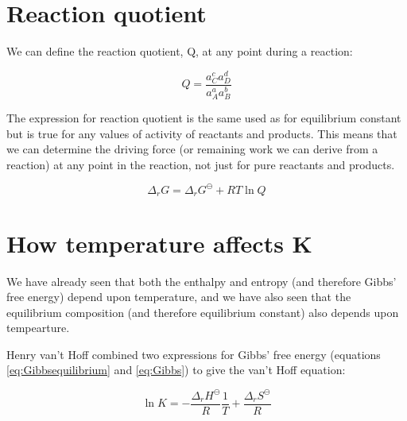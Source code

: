 \documentclass[
]{book}
\begin{document}
\hypertarget{reaction-quotient}{%
\section{Reaction quotient}\label{reaction-quotient}}

We can define the reaction quotient, Q, at any point during a reaction:

\begin{equation}
Q = \frac{a_C^ca_D^d}{a_A^aa_B^b}
\label{eq:quotient}
\end{equation}

The expression for reaction quotient is the same used as for equilibrium constant but is true for any values of activity of reactants and products. This means that we can determine the driving force (or remaining work we can derive from a reaction) at any point in the reaction, not just for pure reactants and products.

\begin{equation}
\Delta _r G = \Delta _r G ^ \ominus + RT \ln Q
\label{eq:gibbsquotient}
\end{equation}

\hypertarget{how-temperature-affects-k}{%
\section{How temperature affects K}\label{how-temperature-affects-k}}

We have already seen that both the enthalpy and entropy (and therefore Gibbs' free energy) depend upon temperature, and we have also seen that the equilibrium composition (and therefore equilibrium constant) also depends upon tempearture.

Henry van't Hoff combined two expressions for Gibbs' free energy (equations \eqref{eq:Gibbsequilibrium} and \eqref{eq:Gibbs}) to give the van't Hoff equation:

\begin{equation}
\ln K = -\frac{\Delta_r H^\ominus }{R}\frac{1}{T}+ \frac{\Delta_r S^\ominus }{R}
\label{eq:vanthoff}
\end{equation}
\end{document}
